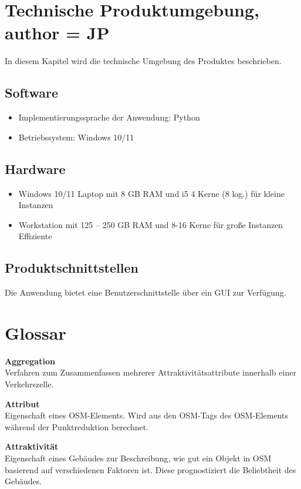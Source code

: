 \documentclass[parskip=full]{scrartcl} %
\begin{document}
\section{Technische Produktumgebung, author = JP}
In diesem Kapitel wird die technische Umgebung des Produktes beschrieben.

\subsection{Software}
\begin{itemize}
    \item Implementierungssprache der Anwendung: Python
    \item Betriebssystem: Windows 10/11
\end{itemize}

\subsection{Hardware}
\begin{itemize}
    \item Windows 10/11 Laptop mit 8 GB RAM und i5 4 Kerne (8 log.) für kleine Instanzen
    \item Workstation mit 125 – 250 GB RAM und 8-16 Kerne für große Instanzen Effiziente
\end{itemize}

\subsection{Produktschnittstellen}
Die Anwendung bietet eine Benutzerschnittstelle über ein GUI zur Verfügung.
\newpage





\section{Glossar}

\textbf{Aggregation}\\
Verfahren zum Zusammenfassen mehrerer Attraktivitätsattribute innerhalb einer Verkehrszelle.

\textbf{Attribut}\\
Eigenschaft eines OSM-Elements. Wird aus den OSM-Tags des OSM-Elements während der Punktreduktion berechnet.

\textbf{Attraktivität}\\
Eigenschaft eines Gebäudes zur Beschreibung, wie gut ein Objekt in OSM basierend auf verschiedenen Faktoren ist. Diese prognostiziert die Beliebtheit des Gebäudes.
\end{document}
